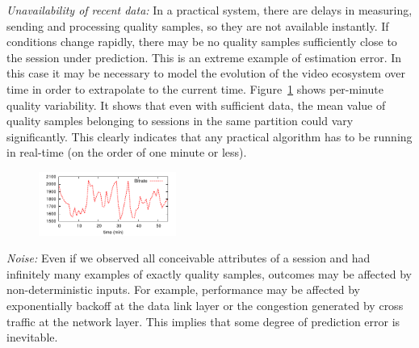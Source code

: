 \begin{packedenumerate}
\item \emph{Unavailability of recent data:} In a practical system,
  there are delays in measuring, sending and processing quality
  samples, so they are not available instantly.  If conditions change
  rapidly, there may be no quality samples sufficiently close to the
  session under prediction.  This is an extreme example of estimation
  error.  In this case it may be necessary to model the evolution of
  the video ecosystem over time in order to extrapolate to the current
  time. Figure~\ref{fig:quality-variability} shows per-minute quality
  variability. It shows that even with sufficient data, the mean value
  of quality samples belonging to sessions in the same partition could
  vary significantly. This clearly indicates that any practical
  algorithm has to be running in real-time (on the order of one minute
  or less).

\begin{figure}[h!]
\centering
 \includegraphics[width=0.4\textwidth] {figures/quality-time.pdf}
\label{fig:quality-variability}
\end{figure}

\item \emph{Noise:} Even if we observed all conceivable attributes of
  a session and had infinitely many examples of exactly quality
  samples, outcomes may be affected by non-deterministic inputs.  For
  example, performance may be affected by exponentially backoff at the
  data link layer or the congestion generated by cross traffic at the
  network layer. This implies that some degree of prediction error is
  inevitable.  %
\end{packedenumerate}


